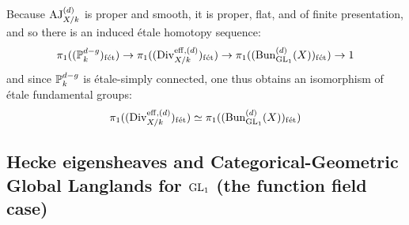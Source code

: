         \begin{corollary} \label{coro: galois_representations_induced_by_the_abel_jacobi_map}
            Because $\AJ_{X/k}^{(d)}$ is proper and smooth, it is proper, flat, and of finite presentation, and so there is an induced \'etale homotopy sequence:
                $$\pi_1((\P^{d - g}_k)_{\fet}) \to \pi_1((\Div_{X/k}^{\eff, (d)})_{\fet}) \to \pi_1((\Bun_{\GL_1}^{(d)}(X))_{\fet}) \to 1$$
            and since $\P^{d - g}_k$ is \'etale-simply connected, one thus obtains an isomorphism of \'etale fundamental groups:
                $$\pi_1((\Div_{X/k}^{\eff, (d)})_{\fet}) \cong \pi_1((\Bun_{\GL_1}^{(d)}(X))_{\fet})$$
        \end{corollary}
    
    \subsection{Hecke eigensheaves and Categorical-Geometric Global Langlands for \texorpdfstring{$\GL_1$}{} (the function field case)}

